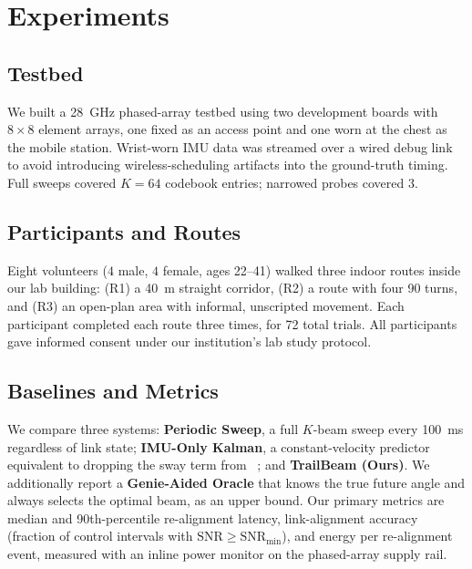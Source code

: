 \section{Experiments}
\subsection{Testbed}
We built a 28~GHz phased-array testbed using two development boards with $8\times8$ element arrays, one fixed as an access point and one worn at the chest as the mobile station. Wrist-worn IMU data was streamed over a wired debug link to avoid introducing wireless-scheduling artifacts into the ground-truth timing. Full sweeps covered $K = 64$ codebook entries; narrowed probes covered 3.

\subsection{Participants and Routes}
Eight volunteers ($4$ male, $4$ female, ages 22--41) walked three indoor routes inside our lab building: (R1) a 40~m straight corridor, (R2) a route with four 90\textdegree{} turns, and (R3) an open-plan area with informal, unscripted movement. Each participant completed each route three times, for 72 total trials. All participants gave informed consent under our institution's lab study protocol.

\subsection{Baselines and Metrics}
We compare three systems: \textbf{Periodic Sweep}, a full $K$-beam sweep every 100~ms regardless of link state; \textbf{IMU-Only Kalman}, a constant-velocity predictor equivalent to dropping the sway term from ~\cite{kowalczyk2021kalman}; and \textbf{TrailBeam (Ours)}. We additionally report a \textbf{Genie-Aided Oracle} that knows the true future angle and always selects the optimal beam, as an upper bound. Our primary metrics are median and 90th-percentile re-alignment latency, link-alignment accuracy (fraction of control intervals with $\mathrm{SNR} \geq \mathrm{SNR}_{\min}$), and energy per re-alignment event, measured with an inline power monitor on the phased-array supply rail.
